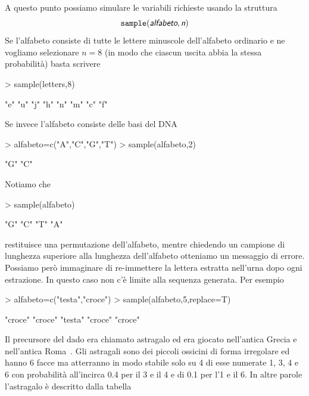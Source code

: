 \documentclass[onecolumn,12pt]{book}
\newcommand{\varia}[1]{\textsl{\textsf{#1}}}
\begin{document}
A questo punto possiamo simulare le variabili richieste usando la struttura
\begin{equation}\texttt{sample}(\varia{alfabeto},\varia{n})\end{equation}
Se l'alfabeto consiste di tutte le lettere minuscole dell'alfabeto ordinario e ne vogliamo selezionare $n=8$  (in modo che ciascun uscita abbia la stessa probabilit\`a)  basta scrivere
\begin{Schunk}
\begin{Sinput}
> sample(letters,8)
\end{Sinput}
\begin{Soutput}
[1] "e" "u" "j" "h" "n" "m" "c" "f"
\end{Soutput}
\end{Schunk}
Se invece l'alfabeto consiste delle basi del DNA
\begin{Schunk}
\begin{Sinput}
> alfabeto=c("A","C","G","T")
> sample(alfabeto,2)
\end{Sinput}
\begin{Soutput}
[1] "G" "C"
\end{Soutput}
\end{Schunk}
Notiamo che
\begin{Schunk}
\begin{Sinput}
>  sample(alfabeto)
\end{Sinput}
\begin{Soutput}
[1] "G" "C" "T" "A"
\end{Soutput}
\end{Schunk}
restituisce una permutazione dell'alfabeto, mentre chiedendo un campione di lunghezza superiore alla lunghezza dell'alfabeto otteniamo un messaggio di errore. Possiamo per\`o immaginare di re-immettere la lettera estratta nell'urna dopo ogni estrazione. In questo caso non c'\`e limite alla sequenza generata.
Per esempio
\begin{Schunk}
\begin{Sinput}
> alfabeto=c("testa","croce")
> sample(alfabeto,5,replace=T)
\end{Sinput}
\begin{Soutput}
[1] "croce" "croce" "testa" "croce" "croce"
\end{Soutput}
\end{Schunk}
 

Il precursore  del dado era chiamato astragalo ed era giocato nell'antica Grecia e nell'antica Roma~\cite{david}.
Gli  astragali sono dei piccoli ossicini di forma irregolare ed hanno 6 facce ma atterranno in  modo stabile solo su 4 di esse numerate 1, 3, 4 e 6  con probabilit\`a all'incirca 0.4 per il 3 e il 4  e di 0.1 per l'1 e il 6. In altre parole l'astragalo \`e descritto dalla tabella
\end{document}
